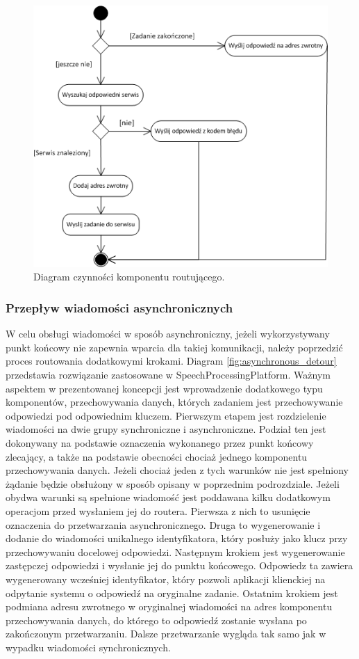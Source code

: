 \begin{figure}[!h]
	\centering
	\includegraphics[scale=0.75]{router_activity.png}
	\caption{Diagram czynności komponentu routującego. }\label{fig:router_activity_diagram}
\end{figure}

\subsubsection*{Przepływ wiadomości asynchronicznych}
W celu obsługi wiadomości w sposób asynchroniczny, jeżeli wykorzystywany punkt końcowy nie zapewnia wparcia dla takiej komunikacji, należy poprzedzić proces routowania dodatkowymi krokami.
Diagram \ref{fig:asynchronous_detour} przedstawia rozwiązanie zastosowane w SpeechProcessingPlatform. Ważnym aspektem w prezentowanej koncepcji jest wprowadzenie dodatkowego typu komponentów, przechowywania danych, których zadaniem jest przechowywanie odpowiedzi pod odpowiednim kluczem. Pierwszym etapem jest rozdzielenie wiadomości na dwie grupy synchroniczne i asynchroniczne. Podział ten jest dokonywany na podstawie oznaczenia wykonanego przez punkt końcowy zlecający, a także na podstawie obecności chociaż jednego komponentu przechowywania danych. Jeżeli chociaż jeden z tych warunków nie jest spełniony żądanie będzie obsłużony w sposób opisany w poprzednim podrozdziale. Jeżeli obydwa warunki są spełnione wiadomość jest poddawana kilku dodatkowym operacjom przed wysłaniem jej do routera. Pierwsza z nich to usunięcie oznaczenia do przetwarzania asynchronicznego. Druga to wygenerowanie i dodanie do wiadomości unikalnego identyfikatora, który posłuży jako klucz przy przechowywaniu docelowej odpowiedzi. Następnym krokiem jest wygenerowanie zastępczej odpowiedzi i wysłanie jej do punktu końcowego. Odpowiedz ta zawiera wygenerowany wcześniej identyfikator, który pozwoli aplikacji klienckiej na odpytanie systemu o odpowiedź na oryginalne zadanie. Ostatnim krokiem jest podmiana adresu zwrotnego w oryginalnej wiadomości na adres komponentu przechowywania danych, do którego to odpowiedź zostanie wysłana po zakończonym przetwarzaniu.  Dalsze przetwarzanie wygląda tak samo jak w wypadku wiadomości synchronicznych.


